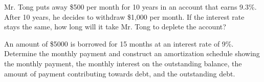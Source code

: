 \begin{puzzle}
    Mr. Tong puts away \$500 per month for 10 years in an account that earns 9.3\%. After 10 years, he decides to withdraw \$1,000 per month. If the interest rate stays the same, how long will it take Mr. Tong to deplete the account?
\end{puzzle}

\begin{puzzle}
    An amount of \$5000 is borrowed for 15 months at an interest rate of 9\%. Determine the monthly payment and construct an amortization schedule showing the monthly payment, the monthly interest on the outstanding balance, the amount of payment contributing towards debt, and the outstanding debt.
\end{puzzle}
